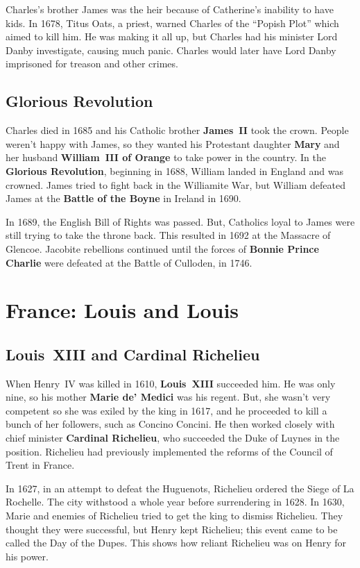 Charles's brother James was the heir because of Catherine's inability to have kids.
In 1678, Titus Oats, a priest, warned Charles of the ``Popish Plot'' which aimed to kill him.
He was making it all up, but Charles had his minister Lord Danby investigate, causing much panic.
Charles would later have Lord Danby imprisoned for treason and other crimes.

\subsection*{Glorious Revolution}

Charles died in 1685 and his Catholic brother \textbf{James~II} took the crown.
People weren't happy with James,
so they wanted his Protestant daughter \textbf{Mary} and her husband \textbf{William~III of Orange}
to take power in the country.
In the \textbf{Glorious Revolution}, beginning in 1688, William landed in England and was crowned.
James tried to fight back in the Williamite War,
but William defeated James at the \textbf{Battle of the Boyne} in Ireland in 1690.

In 1689, the English Bill of Rights was passed.
But, Catholics loyal to James were still trying to take the throne back.
This resulted in 1692 at the Massacre of Glencoe.
Jacobite rebellions continued until the forces of
\textbf{Bonnie Prince Charlie} were defeated at the Battle of Culloden, in 1746.

\section{France: Louis and Louis}

\subsection*{Louis~XIII and Cardinal Richelieu}

When Henry~IV was killed in 1610, \textbf{Louis~XIII} succeeded him.
He was only nine, so his mother \textbf{Marie de' Medici} was his regent.
But, she wasn't very competent so she was exiled by the king in 1617,
and he proceeded to kill a bunch of her followers, such as Concino Concini.
He then worked closely with chief minister \textbf{Cardinal Richelieu},
who succeeded the Duke of Luynes in the position.
Richelieu had previously implemented the reforms of the Council of Trent in France.

In 1627, in an attempt to defeat the Huguenots, Richelieu ordered the Siege of La Rochelle.
The city withstood a whole year before surrendering in 1628.
In 1630, Marie and enemies of Richelieu tried to get the king to dismiss Richelieu.
They thought they were successful, but Henry kept Richelieu;
this event came to be called the Day of the Dupes.
This shows how reliant Richelieu was on Henry for his power.

